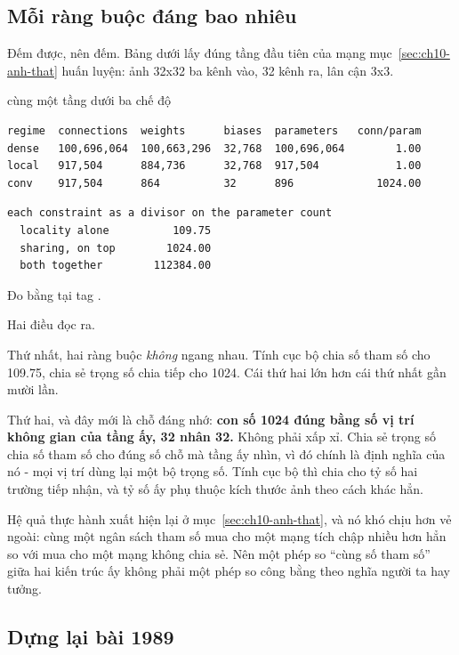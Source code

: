 \subsection*{Mỗi ràng buộc đáng bao nhiêu}

%
Đếm được, nên đếm. Bảng dưới lấy đúng tầng đầu tiên của mạng
mục~\ref{sec:ch10-anh-that} huấn luyện: ảnh 32x32 ba kênh vào, 32 kênh ra, lân
cận 3x3.

\begin{measured}{cùng một tầng dưới ba chế độ}
\begin{verbatim}
regime  connections  weights      biases  parameters   conn/param
dense   100,696,064  100,663,296  32,768  100,696,064        1.00
local   917,504      884,736      32,768  917,504            1.00
conv    917,504      864          32      896             1024.00
\end{verbatim}

\begin{verbatim}
each constraint as a divisor on the parameter count
  locality alone          109.75
  sharing, on top        1024.00
  both together        112384.00
\end{verbatim}

Đo bằng  tại tag .
\end{measured}

Hai điều đọc ra.

Thứ nhất, hai ràng buộc \emph{không} ngang nhau. Tính cục bộ chia số tham số
cho 109.75, chia sẻ trọng số chia tiếp cho 1024. Cái thứ hai lớn hơn cái thứ
nhất gần mười lần.

Thứ hai, và đây mới là chỗ đáng nhớ: \textbf{con số 1024 đúng bằng số vị trí
không gian của tầng ấy, 32 nhân 32.} Không phải xấp xỉ. Chia sẻ trọng số chia
số tham số cho đúng số chỗ mà tầng ấy nhìn, vì đó chính là định nghĩa của nó -
mọi vị trí dùng lại một bộ trọng số. Tính cục bộ thì chia cho tỷ số hai trường
tiếp nhận, và tỷ số ấy phụ thuộc kích thước ảnh theo cách khác hẳn.

Hệ quả thực hành xuất hiện lại ở mục~\ref{sec:ch10-anh-that}, và nó khó chịu
hơn vẻ ngoài: cùng một ngân sách tham số mua cho một mạng tích chập nhiều hơn
hẳn so với mua cho một mạng không chia sẻ. Nên một phép so \enquote{cùng số
tham số} giữa hai kiến trúc ấy không phải một phép so công bằng theo nghĩa
người ta hay tưởng.

\subsection*{Dựng lại bài 1989}

